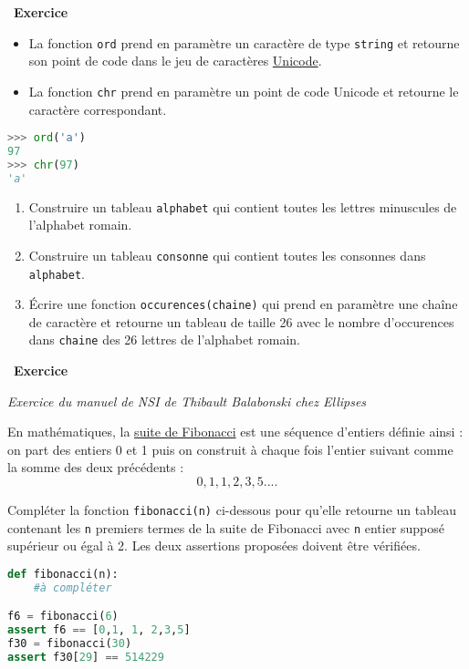 \documentclass[
  11pt,
]{article}
\newcommand{\passthrough}[1]{#1}
\providecommand{\tightlist}{%
  \setlength{\itemsep}{0pt}\setlength{\parskip}{0pt}}
\newcounter{exo}
\newenvironment{exercice}[1]
{\par \medskip   \addtocounter{exo}{1} \noindent  
\begin{bclogo}[arrondi =0.1,   noborder = true, logo=\bccrayon, marge=4]{~\textbf{Exercice} \textbf{\theexo} {\itshape #1} }  \par}
{
\end{bclogo}
 \par \bigskip }
\newcounter{thme}
\newcounter{prop}
\newcounter{def}
\begin{document}
\begin{exercice}{}

\begin{itemize}
\tightlist
\item
  La fonction \passthrough{\lstinline!ord!} prend en paramètre un
  caractère de type \passthrough{\lstinline!string!} et retourne son
  point de code dans le jeu de caractères
  \href{https://fr.wikipedia.org/wiki/Unicode}{Unicode}.
\item
  La fonction \passthrough{\lstinline!chr!} prend en paramètre un point
  de code Unicode et retourne le caractère correspondant.
\end{itemize}

\begin{lstlisting}[language=Python]
>>> ord('a')
97
>>> chr(97)
'a'
\end{lstlisting}

\begin{enumerate}
\def\labelenumi{\arabic{enumi}.}
\tightlist
\item
  Construire un tableau \passthrough{\lstinline!alphabet!} qui contient
  toutes les lettres minuscules de l'alphabet romain.
\item
  Construire un tableau \passthrough{\lstinline!consonne!} qui contient
  toutes les consonnes dans \passthrough{\lstinline!alphabet!}.
\item
  Écrire une fonction \passthrough{\lstinline!occurences(chaine)!} qui
  prend en paramètre une chaîne de caractère et retourne un tableau de
  taille 26 avec le nombre d'occurences dans
  \passthrough{\lstinline!chaine!} des 26 lettres de l'alphabet romain.
\end{enumerate}

\end{exercice}

\begin{exercice}{}

\emph{Exercice du manuel de NSI de Thibault Balabonski chez Ellipses}

En mathématiques, la
\href{http://images.math.cnrs.fr/Mysteres-arithmetiques-de-la-suite-de-Fibonacci.html}{suite
de Fibonacci} est une séquence d'entiers définie ainsi : on part des
entiers 0 et 1 puis on construit à chaque fois l'entier suivant comme la
somme des deux précédents : \[0, 1, 1, 2, 3, 5 ....\]

Compléter la fonction \passthrough{\lstinline!fibonacci(n)!} ci-dessous
pour qu'elle retourne un tableau contenant les
\passthrough{\lstinline!n!} premiers termes de la suite de Fibonacci
avec \passthrough{\lstinline!n!} entier supposé supérieur ou égal à 2.
Les deux assertions proposées doivent être vérifiées.

\begin{lstlisting}[language=Python]
def fibonacci(n):
    #à compléter

f6 = fibonacci(6)
assert f6 == [0,1, 1, 2,3,5]
f30 = fibonacci(30)
assert f30[29] == 514229
\end{lstlisting}

\end{exercice}
\end{document}
